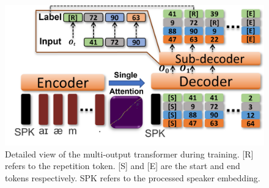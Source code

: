 \begin{figure}[!htb]
\centering
    \includegraphics[width=0.95\columnwidth]{imgs/transformer-training.png}
\caption{Detailed view of the multi-output transformer during training. [R] refers to the repetition token. [S] and [E] are the start and end tokens respectively. SPK refers to the processed speaker embedding.}
\label{fig:tts}
\end{figure}